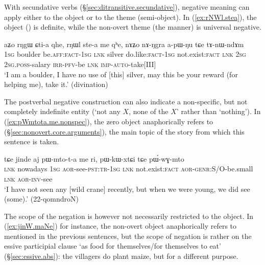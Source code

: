 With secundative verbs (§\ref{sec:ditransitive.secundative}), negative meaning can apply either to the object or to the theme (semi-object). In (\ref{ex:rNWl.stea}), the object () is definite, while the non-overt theme (the manner) is universal negative.
 

\begin{exe}
\ex \label{ex:rNWl.stea}
\gll aʑo rŋgɯ ɕti-a qhe, rŋɯl ste-a me qʰe, nɤʑo nɤ-ŋgra a-pɯ-ŋu tɕe tɤ-nɯ-ndɤm \\
\textsc{1sg} boulder be.\textsc{aff}:\textsc{fact}-\textsc{1sg} \textsc{lnk} silver do.like:\textsc{fact}-\textsc{1sg} not.exist:\textsc{fact} \textsc{lnk} \textsc{2sg} \textsc{2sg}.\textsc{poss}-salary \textsc{irr}-\textsc{pfv}-be \textsc{lnk} \textsc{imp}-\textsc{auto}-take[III] \\
\glt `I am a boulder, I have no use of [this] silver, may this be your reward (for helping me), take it.' (divination)
\end{exe}

The postverbal negative construction can also indicate a non-specific, but not completely indefinite entity (`not any $X$, none of the $X$' rather than `nothing'). In (\ref{ex:pWmtota.me.nonspec}), the zero object anaphorically refers to  (§\ref{sec:nonovert.core.arguments}), the main topic of the story from which this sentence is taken.

\begin{exe}
\ex \label{ex:pWmtota.me.nonspec}
\gll tɕe jinde aj pɯ-mto-t-a me ri, pɯ-kɯ-xtɕi tɕe pɯ́-wɣ-mto \\
\textsc{lnk} nowadays \textsc{1sg} \textsc{aor}-see-\textsc{pst}:\textsc{tr}-\textsc{1sg} \textsc{lnk} not.exist:\textsc{fact} \textsc{aor}-\textsc{genr}:S/O-be.small \textsc{lnk} \textsc{aor}-\textsc{inv}-see \\
\glt `I have not seen any [wild crane] recently, but when we were young, we did see (some).' (22-qomndroN)
\end{exe}

The scope of the negation is however not necessarily restricted to the object. In (\ref{ex:jinW.maNe}) for instance, the non-overt object anaphorically refers to  mentioned in the previous sentences, but the scope of negation is rather on the essive participial clause  `as food for themselves/for themselves to eat' (§\ref{sec:essive.abs}): the villagers do  plant maize, but for a different purpose.
 
